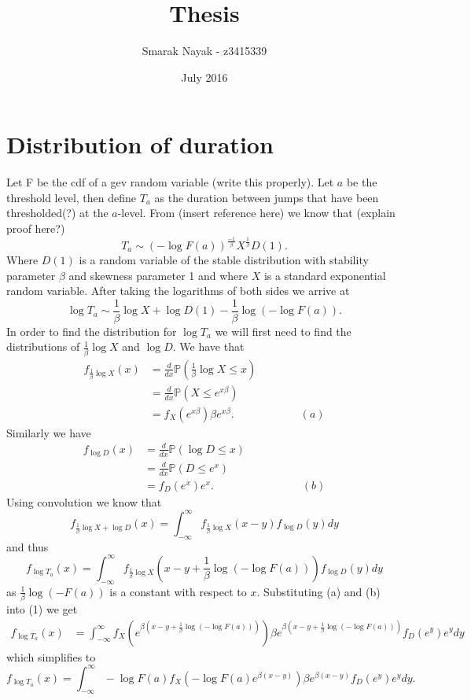 \documentclass{article}
\title{Thesis}
\author{Smarak Nayak - z3415339 }
\date{July 2016}
\newcommand{\Prob}{\mathbb{P}}
\begin{document}
\maketitle
\section*{Distribution of duration}
Let F be the cdf of a gev random variable (write this properly). Let $a$ be the threshold level, then define $T_a$ as the duration between jumps that have been thresholded(?) at the $a$-level. From (insert reference here) we know that (explain proof here?)
\[
    T_a \sim (-\log F(a))^{\frac{-1}{\beta}}X^{\frac{1}{\beta}}D(1).
\]
Where $D(1)$ is a random variable of the stable distribution with stability parameter $\beta$ and skewness parameter 1 and where $X$ is a standard exponential random variable.
After taking the logarithms of both sides we arrive at
\[
    \log T_a \sim \frac{1}{\beta}\log X + \log D(1) -\frac{1}{\beta}\log(-\log F(a)).
\]
In order to find the distribution for $\log T_a$ we will first need to find the distributions of $\frac{1}{\beta}\log X$ and $\log D$. We have that 
\begin{align*}
    f_{\frac{1}{\beta}\log X}(x) &= \frac{d}{dx}\Prob\left(\frac{1}{\beta}\log X\leq x\right)\\
                                 &= \frac{d}{dx}\Prob(X\leq e^{x\beta})\\
                                 &= f_X(e^{x\beta})\beta e^{x\beta}.\qquad\qquad\qquad (a)
\end{align*}
Similarly we have
\begin{align*}
    f_{\log D}(x)&= \frac{d}{dx}\Prob(\log D\leq x)\\
                 &= \frac{d}{dx}\Prob(D\leq e^x)\\
                 &= f_D(e^x)e^x. \qquad\qquad\qquad\qquad (b)
\end{align*}
Using convolution we know that
\[
    f_{\frac{1}{\beta}\log X+\log D}(x)= \int^\infty_{-\infty} f_{\frac{1}{\beta}\log X}(x-y)f_{\log D}(y)dy
\]
and thus 
\begin{equation}
    f_{\log T_a}(x)=\int^\infty_{-\infty} f_{\frac{1}{\beta}\log X}\left(x-y+\frac{1}{\beta}\log(-\log F(a))\right)f_{\log D}(y)dy
\end{equation}
as $\frac{1}{\beta}\log(-F(a))$ is a constant with respect to $x$. Substituting (a) and (b) into (1) we get
\begin{align*}
    f_{\log T_a}(x)&=\int^\infty_{-\infty} f_X(e^{ \beta(x-y+\frac{1}{\beta}\log(-\log F(a)))})
    \beta e^{ \beta(x-y+\frac{1}{\beta}\log(-\log F(a)))}f_D(e^y)e^y dy
\end{align*}
which simplifies to
\[
    f_{\log T_a}(x)=\int^\infty_{-\infty} - \log F(a) f_X(-\log F(a)e^{\beta(x-y)})\beta e^{\beta(x-y)} f_D(e^y)e^y dy.
\]
\end{document}
